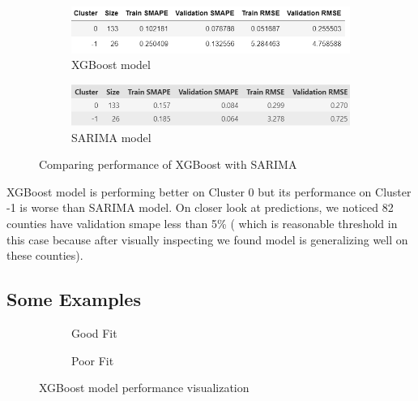 \documentclass{article}
\begin{document}
\begin{figure}[h]
	\centering
	\vspace{1em}
	\begin{subfigure}{0.6\textwidth}
		\includegraphics[width=\linewidth]{images/xgboost_results}
		\caption{XGBoost model}
		\label{fig:arima}
	\end{subfigure}
	
	\begin{subfigure}{0.6\textwidth}
		\centering
		\includegraphics[width=\linewidth]{images/benchmark_xgboost_with_sarima}
		\caption{SARIMA model}
		\label{fig:sarima_vs_arima}
	\end{subfigure}
	\caption{Comparing performance of XGBoost with SARIMA}
	\label{fig:sarima_arima_both}
\end{figure}

XGBoost model is performing better on Cluster 0 but its performance on Cluster -1 is
worse than SARIMA model. On closer look at predictions, we noticed 82 counties have validation smape less than 5\% ( which is reasonable threshold in this case because after visually inspecting we found model is generalizing well on these counties).


\newpage
\subsection{Some Examples}


\begin{figure}[h]
	\centering
	\vspace{1em}
	\begin{subfigure}{0.45\textwidth}
		\caption{Good Fit}
		\label{fig:xgboost_good}
	\end{subfigure}
	\begin{subfigure}{0.45\textwidth}
		\caption{Poor Fit}
		\label{fig:xgboost_poor}
	\end{subfigure}
	\caption{XGBoost model performance visualization}
	\label{fig:xgboost_both}
\end{figure}
\end{document}
